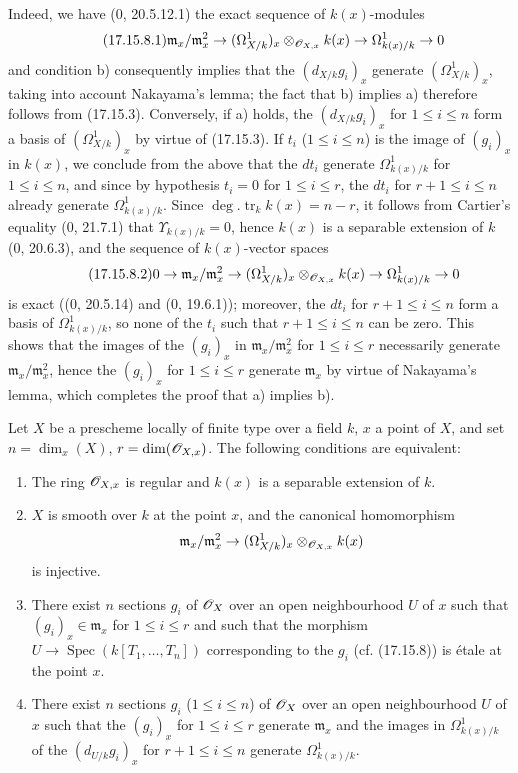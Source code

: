 Indeed, we have (0, 20.5.12.1) the exact sequence of $k(x)$-modules
\[
\label{IV.17.15.8.1}
\tag{17.15.8.1}
\mathfrak m_x/\mathfrak m_x^2\to(\Omega^1_{X/k})_x\otimes_{\mathscr{O}_{X,x}}k(x)\to\Omega^1_{k(x)/k}\to0
\]
and condition b) consequently implies that the $(d_{X/k}g_i)_x$ generate $(\Omega^1_{X/k})_x$, taking into account Nakayama's lemma; the fact that b) implies a) therefore follows from (17.15.3). Conversely, if a) holds, the $(d_{X/k}g_i)_x$ for $1\leq i\leq n$ form a basis of $(\Omega^1_{X/k})_x$ by virtue of (17.15.3). If $t_i$ ($1\leq i\leq n$) is the image of $(g_i)_x$ in $k(x)$, we conclude from the above that the $dt_i$ generate $\Omega^1_{k(x)/k}$ for $1\leq i\leq n$, and since by hypothesis $t_i=0$ for $1\leq i\leq r$, the $dt_i$ for $r+1\leq i\leq n$ already generate $\Omega^1_{k(x)/k}$. Since $\deg.\operatorname{tr}_k k(x)=n-r$, it follows from Cartier's equality (0, 21.7.1) that $\Upsilon_{k(x)/k}=0$, hence $k(x)$ is a separable extension of $k$ (0, 20.6.3), and the sequence of $k(x)$-vector spaces
\[
\label{IV.17.15.8.2}
\tag{17.15.8.2}
0\to\mathfrak m_x/\mathfrak m_x^2\to(\Omega^1_{X/k})_x\otimes_{\mathscr{O}_{X,x}}k(x)\to\Omega^1_{k(x)/k}\to0
\]
is exact ((0, 20.5.14) and (0, 19.6.1)); moreover, the $dt_i$ for $r+1\leq i\leq n$ form a basis of $\Omega^1_{k(x)/k}$, so none of the $t_i$ such that $r+1\leq i\leq n$ can be zero. This shows that the images of the $(g_i)_x$ in $\mathfrak m_x/\mathfrak m_x^2$ for $1\leq i\leq r$ necessarily generate $\mathfrak m_x/\mathfrak m_x^2$, hence the $(g_i)_x$ for $1\leq i\leq r$ generate $\mathfrak m_x$ by virtue of Nakayama's lemma, which completes the proof that a) implies b).

\begin{corollary}[17.15.9]
\label{IV.17.15.9}
Let $X$ be a prescheme locally of finite type over a field $k$, $x$ a point of $X$, and set $n=\dim_x(X)$, $r=\dim(\mathscr{O}_{X,x})$. The following conditions are equivalent:
\begin{enumerate}
  \item[a)] The ring $\mathscr{O}_{X,x}$ is regular and $k(x)$ is a separable extension of $k$.
  \item[b)] $X$ is smooth over $k$ at the point $x$, and the canonical homomorphism
  \[
  \mathfrak m_x/\mathfrak m_x^2\to(\Omega^1_{X/k})_x\otimes_{\mathscr{O}_{X,x}}k(x)
  \]
  is injective.
  \item[c)] There exist $n$ sections $g_i$ of $\mathscr{O}_X$ over an open neighbourhood $U$ of $x$ such that $(g_i)_x\in\mathfrak m_x$ for $1\leq i\leq r$ and such that the morphism $U\to\operatorname{Spec}(k[T_1,\ldots,T_n])$ corresponding to the $g_i$ (cf. (17.15.8)) is étale at the point $x$.
  \item[d)] There exist $n$ sections $g_i$ ($1\leq i\leq n$) of $\mathscr{O}_X$ over an open neighbourhood $U$ of $x$ such that the $(g_i)_x$ for $1\leq i\leq r$ generate $\mathfrak m_x$ and the images in $\Omega^1_{k(x)/k}$ of the $(d_{U/k}g_i)_x$ for $r+1\leq i\leq n$ generate $\Omega^1_{k(x)/k}$.
\end{enumerate}
\end{corollary}

